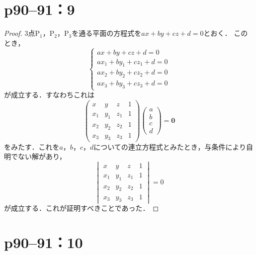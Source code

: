 \documentclass[a4paper,10pt,fleqn]{ltjsarticle}
\begin{document}
\newpage

\section*{p90--91：9}

\begin{tleftbar}
  \begin{proof}
    3点$\mathrm{P}_1$，$\mathrm{P_2}$，$\mathrm{P_3}$を通る平面の方程式を$ax+by+cz+d=0$とおく．
    このとき，
    \[
      \begin{cases}
        ax+by+cz + d =0         \\
        ax_1 + by_1 +cz_1 +d =0 \\
        ax_2 + by_2 +cz_2 +d =0 \\
        ax_3 + by_3 +cz_3 +d =0
      \end{cases}
    \]
    が成立する．すなわちこれは
    \[
      \begin{pmatrix}
        x   & y   & z   & 1 \\
        x_1 & y_1 & z_1 & 1 \\
        x_2 & y_2 & z_2 & 1 \\
        x_3 & y_3 & z_3 & 1
      \end{pmatrix}
      \begin{pmatrix}
        a \\
        b \\
        c \\
        d
      \end{pmatrix}
      = \bm{0}
    \]
    をみたす．これを$a$，$b$，$c$，$d$についての連立方程式とみたとき，与条件により自明でない解があり，
    \[
      \begin{vmatrix}
        x   & y   & z   & 1 \\
        x_1 & y_1 & z_1 & 1 \\
        x_2 & y_2 & z_2 & 1 \\
        x_3 & y_3 & z_3 & 1
      \end{vmatrix}
      =0
    \]
    が成立する．これが証明すべきことであった．
  \end{proof}
\end{tleftbar}

\newpage

\section*{p90--91：10}
\end{document}
